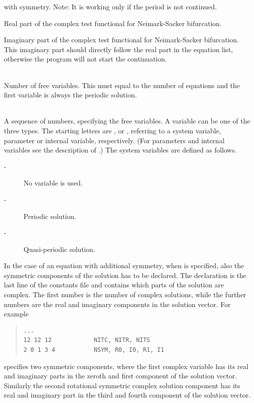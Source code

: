 \documentclass[10pt,a4paper]{ddedoc}
\begin{document}
\begin{description}
\begin{description}
with symmetry. Note: It is working only if the period is not continued.
\item[\funp{E68} -] Real part of the complex test functional for Neimark-Sacker
bifurcation.
\item[\funp{E69} -] Imaginary part of the complex test functional for
Neimark-Sacker bifurcation. This imaginary part should directly follow the real
part in the equation list, otherwise the program will not start the
continuation.
\end{description}
\item[\funp{NVAR}] ~\\
	Number of free variables. This must equal to the number of equations and the
first variable is always the periodic solution.
\item[\funp{VAR}] ~\\
	A sequence of numbers, specifying the free variables. A variable can be one
of the three types. The starting letters are ,  or ,
referring to a system variable, parameter or internal variable, respectively.
(For parameters and internal variables see the description of .) The
system variables are defined as follows.
\begin{description}
\item[ -] No variable is used.
\item[ -] Periodic solution.
\item[ -] Quasi-periodic solution.
\end{description}
In the case of an equation with additional symmetry, when  is
specified, also the symmetric components of the solution has to be declared.
The declaration is the last line of the constants file and contains which parts
of the solution are complex. The first number is the number of complex
solutions,
while the further numbers are the real and imaginary components in the solution
vector. For example
{ \small \begin{quote} \begin{lstlisting}[basicstyle=\tt,frame=single]
...
12 12 12            NITC, NITR, NITS
2 0 1 3 4           NSYM, R0, I0, R1, I1
\end{lstlisting} \end{quote} } \noindent
specifies two symmetric components, where the first complex variable has its
real and imaginary parts in the zeroth and first component of the solution
vector.
Similarly the second rotational symmetric complex solution component has its
real and imaginary part in the third and fourth component of the solution
vector.
\end{description}
\end{document}

